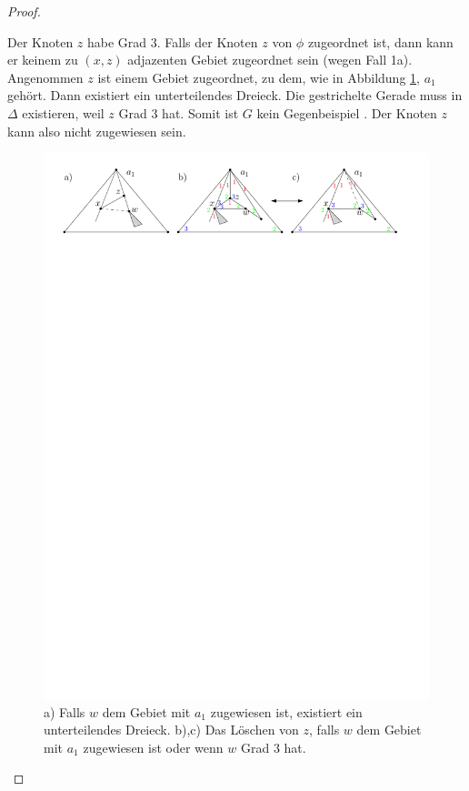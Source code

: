 \begin{proof}
\begin{description}[leftmargin =0pt, font = \rmfamily ,listparindent=\parindent,parsep=0pt]
\item[Fall 1b:] Der Knoten $z$ habe Grad 3. Falls der Knoten $z$ von $\phi$ zugeordnet ist, dann kann er keinem zu $(x,z)$ adjazenten Gebiet zugeordnet sein (wegen Fall 1a). Angenommen $z$ ist einem Gebiet zugeordnet, zu dem, wie in Abbildung \ref{pic_lem5_4}, $a_1$ gehört. Dann existiert ein unterteilendes Dreieck. Die gestrichelte Gerade muss in $\Delta$ existieren, weil $z$ Grad 3 hat. Somit ist $G$ kein Gegenbeispiel . Der Knoten $z$ kann also nicht zugewiesen sein.

\begin{figure}[h]
	\centering
	  \includegraphics[width=1\textwidth]{lem5_4.pdf}
\caption{a) Falls $w$ dem Gebiet mit $a_1$ zugewiesen ist, existiert ein unterteilendes Dreieck. b),c) Das Löschen von $z$, falls $w$ dem Gebiet mit $a_1$ zugewiesen ist oder wenn $w$ Grad 3 hat. }
    	\label{pic_lem5_4}
\end{figure}


\end{description}
\end{proof}
